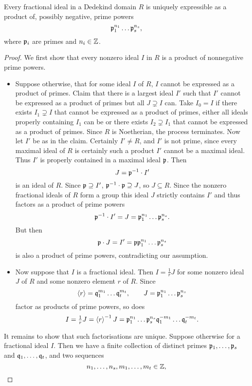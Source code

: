 \begin{proposition}
Every fractional ideal in a Dedekind domain $ R $ is uniquely expressible as a product of, possibly negative, prime powers
$$ \mathfrak{p}_1^{n_1} \dots \mathfrak{p}_s^{n_s}, $$
where $ \mathfrak{p}_i $ are primes and $ n_i \in \mathbb{Z} $.
\end{proposition}

\begin{proof}
We first show that every nonzero ideal $ I $ in $ R $ is a product of nonnegative prime powers.
\begin{itemize}
\item Suppose otherwise, that for some ideal $ I $ of $ R $, $ I $ cannot be expressed as a product of primes. Claim that there is a largest ideal $ I' $ such that $ I' $ cannot be expressed as a product of primes but all $ J \supsetneq I $ can. Take $ I_0 = I $ if there exists $ I_1 \supsetneq I $ that cannot be expressed as a product of primes, either all ideals properly containing $ I_1 $ can be or there exists $ I_2 \supsetneq I_1 $ that cannot be expressed as a product of primes. Since $ R $ is Noetherian, the process terminates. Now let $ I' $ be as in the claim. Certainly $ I' \ne R $, and $ I' $ is not prime, since every maximal ideal of $ R $ is certainly such a product $ I' $ cannot be a maximal ideal. Thus $ I' $ is properly contained in a maximal ideal $ \mathfrak{p} $. Then
$$ J = \mathfrak{p}^{-1} \cdot I' $$
is an ideal of $ R $. Since $ \mathfrak{p} \supseteq I' $, $ \mathfrak{p}^{-1} \cdot \mathfrak{p} \supseteq J $, so $ J \subseteq R $. Since the nonzero fractional ideals of $ R $ form a group this ideal $ J $ strictly contains $ I' $ and thus factors as a product of prime powers
$$ \mathfrak{p}^{-1} \cdot I' = J = \mathfrak{p}_1^{n_1} \dots \mathfrak{p}_s^{n_s}. $$
But then
$$ \mathfrak{p} \cdot J = I' = \mathfrak{p}\mathfrak{p}_1^{n_1} \dots \mathfrak{p}_s^{n_s} $$
is also a product of prime powers, contradicting our assumption.
\item Now suppose that $ I $ is a fractional ideal. Then $ I = \tfrac{1}{r}J $ for some nonzero ideal $ J $ of $ R $ and some nonzero element $ r $ of $ R $. Since
$$ \left\langle r \right\rangle = \mathfrak{q}_1^{m_1} \dots \mathfrak{q}_t^{m_t}, \qquad J = \mathfrak{p}_1^{n_1} \dots \mathfrak{p}_s^{n_s} $$
factor as products of prime powers, so does
$$ I = \tfrac{1}{r}J = \left\langle r \right\rangle^{-1}J = \mathfrak{p}_1^{n_1} \dots \mathfrak{p}_s^{n_s}\mathfrak{q}_1^{-m_1} \dots \mathfrak{q}_t^{-m_t}. $$
\end{itemize}
It remains to show that such factorisations are unique. Suppose otherwise for a fractional ideal $ I $. Then we have a finite collection of distinct primes $ \mathfrak{p}_1, \dots, \mathfrak{p}_s $ and $ \mathfrak{q}_1, \dots, \mathfrak{q}_t $, and two sequences
$$ n_1, \dots, n_s, m_1, \dots, m_t \in \mathbb{Z}, $$

\end{proof}
